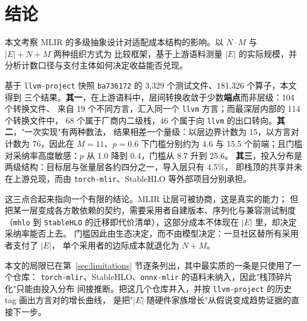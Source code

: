 
\section{结论}
\label{sec:conclusion}

本文考察 MLIR 的多级抽象设计对适配成本结构的影响。以 $N\cdot M$ 与 $|E|+N+M$ 两种组织方式为
比较框架，基于上游语料测量 $|E|$ 的实际规模，并分析计数口径与支付主体如何决定收益能否兑现。

基于 \texttt{llvm-project} 快照 \texttt{ba736172} 的 3,329 个测试文件、181,326 个算子，本文得到
三个结果。\textbf{其一}，在上游语料中，层间转换收敛于少数\textbf{端点}而非层级：104 个转换文件、
来自 19 个不同方言，汇入同一个 \texttt{llvm} 方言；而最深层内部的 114 个转换文件中，
68 个属于厂商内二级栈，46 个属于向 \texttt{llvm} 的出口转向。\textbf{其二}，"一次实现"有两种数法，
结果相差一个量级：以层边界计数为 15，以方言对计数为 76，因此在 $M=11$、$p=0.6$ 下门槛分别约为
4.6 与 15.5 个前端；且门槛对采纳率高度敏感：$p$ 从 1.0 降到 0.4，门槛从 8.7 升到 25.6。
\textbf{其三}，投入分布是两级结构：目标层与张量层各约四分之一，导入层只有 4.5\%，
即栈顶的共享并未在上游兑现，而由 \texttt{torch-mlir}、StableHLO 等外部项目分别承担。

这三点合起来指向一个有限的结论。MLIR 让层可被协商，这是真实的能力；
但把某一层变成各方敢依赖的契约，需要采用者自建版本、序列化与兼容测试制度（\texttt{mhlo} 到
\texttt{StableHLO} 的迁移即代价清单），这部分成本不体现在 $|E|$ 里，却决定采纳率能否上去。
门槛因此由生态决定，而不由模型决定：一旦社区替所有采用者支付了 $|E|$，
单个采用者的边际成本就退化为 $N+M$。

本文的局限已在第~\ref{sec:limitations} 节逐条列出，其中最实质的一条是只使用了一个仓库：
\texttt{torch-mlir}、StableHLO、\texttt{onnx-mlir} 的语料未纳入，因此"栈顶碎片化"只能由投入分布
间接推断。把这几个仓库并入，并按 \texttt{llvm-project} 的历史 tag 画出方言对的增长曲线，
是把"$|E|$ 随硬件家族增长"从假说变成趋势证据的直接下一步。
